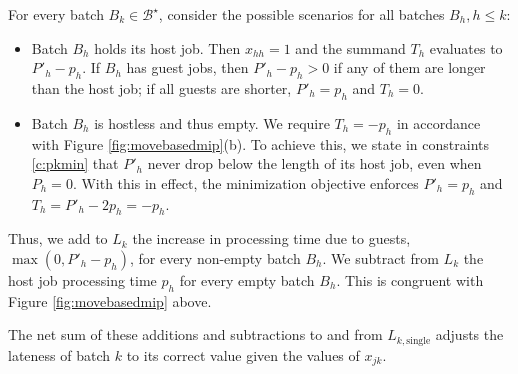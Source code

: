 \documentclass[oribibl]{llncs}
\begin{document}
  For every batch $B_k \in \mathcal{B}^\star$, consider the possible scenarios for all batches
$B_h, h \leq k$:
\begin{itemize}
  \item{Batch $B_h$ holds its host job. Then $x_{hh}=1$ and the summand $T_h$ evaluates
      to $P'_h - p_h$. If $B_h$ has guest jobs, then $P'_h - p_h > 0$ if any of
      them are longer than the host job; if all guests are shorter, $P'_h=p_h$
    and $T_h = 0$.}
  \item{Batch $B_h$ is hostless and thus empty. We require $T_h = -p_h$ in
      accordance with Figure \ref{fig:movebasedmip}(b). To achieve this, we
      state in constraints \eqref{c:pkmin} that $P'_h$ never drop below the
      length of its host job, even when $P_h=0$. With this in effect, the
      minimization objective enforces $P'_h = p_h$ and $T_h = P'_h - 2p_h =
    -p_h$.}
\end{itemize}
Thus, we add to $L_k$ the increase in processing time due
to guests, $\max(0, P'_h-p_h)$, for every non-empty batch $B_h$. We
subtract from $L_k$ the host job processing time $p_h$ for every empty
batch $B_h$. This is congruent with Figure \ref{fig:movebasedmip} above.



The net sum of these additions and subtractions to and from
$L_{k,\mathrm{single}}$ adjusts the lateness of batch $k$ to its correct value
given the values of $x_{jk}$.
\end{document}
